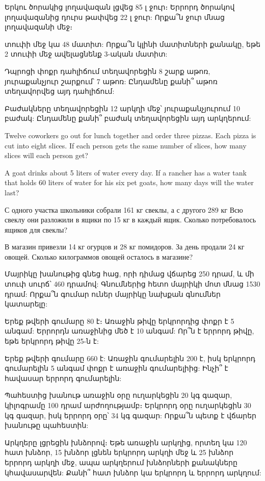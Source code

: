 \textproblem Երկու ծորակից լողավազան լցվեց 85 լ ջուր։ 
Երրորդ ծորակով լողավազանից դուրս թափվեց 22 լ ջուր: Որքա՞ն 
ջուր մնաց լողավազանի մեջ։

 տուփի մեջ կա 48 մատիտ: Որքա՞ն կլինի 
մատիտների քանակը, եթե 2 տուփի մեջ ավելացնենք 3-ական 
մատիտ:

\textproblem Դպրոցի փոքր դահլիճում տեղավորեցին 8 շարք 
աթոռ, յուրաքանչյուր շարքում՝ 7 աթոռ: Ընդամենը քանի՞ աթոռ 
տեղավորվեց այդ դահլիճում:

\textproblem Բաժակները տեղավորեցին 12 արկղի մեջ՝ 
յուրաքանչյուրում 10 բաժակ: Ընդամենը քանի՞ բաժակ 
տեղավորեցին այդ արկղերում:

\textproblem Twelve coworkers go out for lunch together 
and order three pizzas. Each pizza is cut into eight 
slices. If each person gets the same number of slices, 
how many slices will each person get?

\textproblem A goat drinks about 5 liters of water every 
day. If a rancher has a water tank that holds 60 liters 
of water for his six pet goats, how many days will the 
water last?

\textproblem С одного участка школьники собрали 161 кг
свеклы, а с другого 289 кг Всю свеклу они разложили в
ящики по 15 кг в каждый ящик. Сколько потребовалось
ящиков для свеклы?

\textproblem В магазин привезли 14 кг огурцов и
28 кг помидоров. За день продали 24 кг овощей.
Сколько килограммов овощей  осталось в магазине?

\textproblem Մայրիկը խանութից գնեց հաց, որի դիմաց 
վճարեց 250 դրամ, և մի տուփ սուրճ՝ 460 դրամով: 
Գնումներից հետո մայրիկի մոտ մնաց 1530 դրամ: Որքա՞ն 
գումար ուներ մայրիկը նախքան գնումներ կատարելը:

\textproblem Երեք թվերի գումարը 80 է։ Առաջին թիվը 
երկրորդից փոքր է 5 անգամ: Երրորդն առաջինից մեծ է 10 
անգամ: Որ՞ն է երրորդ թիվը, եթե երկրորդ թիվը 25-ն է:

\textproblem Երեք թվերի գումարը 660 է: Առաջին գումարելին 
200 է, իսկ երկրորդ գումարելին 5 անգամ փոքր է առաջին 
գումարելիից: Ինչի՞ է հավասար երրորդ գումարելին:

\textproblem Պահեստից խանութ առաջին օրը ուղարկեցին 
20 կգ գազար, կիլոգրամը 100 դրամ արժողությամբ։ Երկրորդ 
օրը ուղարկեցին 30 կգ գազար, իսկ երրորդ օրը՝ 34 կգ 
գազար: Որքա՞ն պետք է վճարեր խանութը պահեստին:

\textproblem Արկղերը լցրեցին խնձորով։ Եթե առաջին արկղից, 
որտեղ կա 120 հատ խնձոր, 15 խնձոր լցնեն երկրորդ արկղի մեջ 
և 25 խնձոր երրորդ արկղի մեջ, ապա արկղերում խնձորների 
քանակները կհավասարվեն: Քանի՞ հատ խնձոր կա երկրորդ և 
երրորդ արկղում:

